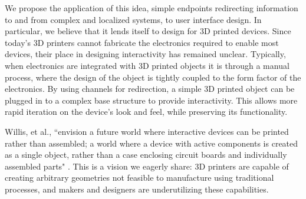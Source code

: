 We propose the application of this idea, simple endpoints redirecting information to and from complex and localized systems, to user interface design.  In particular, we believe that it lends itself to design for 3D printed devices.  Since today's 3D printers cannot fabricate the electronics required to enable most devices, their place in designing interactivity has remained unclear.  Typically, when electronics are integrated with 3D printed objects it is through a manual process, where the design of the object is tightly coupled to the form factor of the electronics.  By using channels for redirection, a simple 3D printed object can be plugged in to a complex base structure to provide interactivity.  This allows more rapid iteration on the device's look and feel, while preserving its functionality.  

Willis, et al., ``envision a future world where interactive devices can be printed rather than assembled; a world where a device with active components is created as a single object, rather than a case enclosing circuit boards and individually assembled parts" \cite{Willis-printedoptics}.  This is a vision we eagerly share: 3D printers are capable of creating arbitrary geometries not feasible to manufacture using traditional processes, and makers and designers are underutilizing these capabilities.



